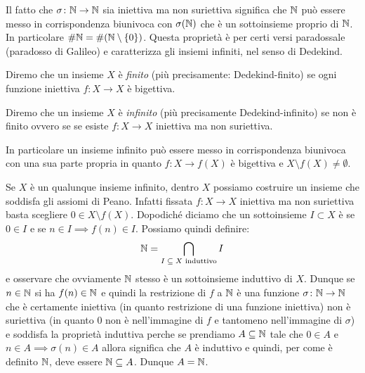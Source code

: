 Il fatto che $\sigma\colon {\mathbb N}\to {\mathbb N}$ sia iniettiva ma non suriettiva 
significa che ${\mathbb N}$ può essere messo in corrispondenza biunivoca con $\sigma({\mathbb N})$ 
che è un sottoinsieme proprio di ${\mathbb N}$.
In particolare $\#{\mathbb N} = \#{\left( {\mathbb N} \setminus{\left\{ 0 \right\}} \right)}$.
Questa proprietà è per certi versi paradossale
(paradosso di Galileo)
%
%
e caratterizza gli 
insiemi infiniti, nel senso di Dedekind.
%
%
\begin{definition}[infinito]
  \label{def:infinito}%
  Diremo che un insieme $X$ è \emph{finito}
  (più precisamente: Dedekind-finito)
  se ogni funzione iniettiva $f\colon X\to X$ è bigettiva.

  Diremo che un insieme $X$ è \emph{infinito} 
  (più precisamente Dedekind-infinito)
  se non è finito ovvero se
  se esiste $f\colon X\to X$ iniettiva ma non suriettiva.
\end{definition}

In particolare un insieme infinito 
può essere messo in corrispondenza biunivoca
con una sua parte propria 
in quanto $f\colon X \to f(X)$ è bigettiva
e $X\setminus f(X)\neq \emptyset$.

Se $X$ è un qualunque insieme infinito, dentro $X$ 
possiamo costruire un insieme che soddisfa gli assiomi di Peano.
Infatti fissata $f\colon X\to X$ iniettiva ma non suriettiva 
basta scegliere $0\in X\setminus f(X)$. 
Dopodiché diciamo che un sottoinsieme $I\subset X$ è 
se $0\in I$ e se $n\in I\implies f(n)\in I$. Possiamo quindi definire:
\[
  {\mathbb N} = \bigcap_{\text{$I\subseteq X$ induttivo}} I
\]
e osservare che ovviamente ${\mathbb N}$ stesso è un sottoinsieme induttivo di $X$.
Dunque se $n\in {\mathbb N}$ si ha $f(n)\in {\mathbb N}$ e quindi la 
restrizione di $f$ a ${\mathbb N}$ è una funzione $\sigma\colon {\mathbb N}\to{\mathbb N}$ 
che è certamente iniettiva (in quanto restrizione di una funzione iniettiva)
non è suriettiva (in quanto $0$ non è nell'immagine di $f$ 
e tantomeno nell'immagine di $\sigma$) e soddisfa la proprietà induttiva 
perche se prendiamo $A\subseteq {\mathbb N}$ tale che $0\in A$ e $n\in A \implies \sigma(n) \in A$ 
allora significa che $A$ è induttivo e quindi, per come è definito ${\mathbb N}$,
deve essere ${\mathbb N}\subseteq A$. Dunque $A={\mathbb N}$.

